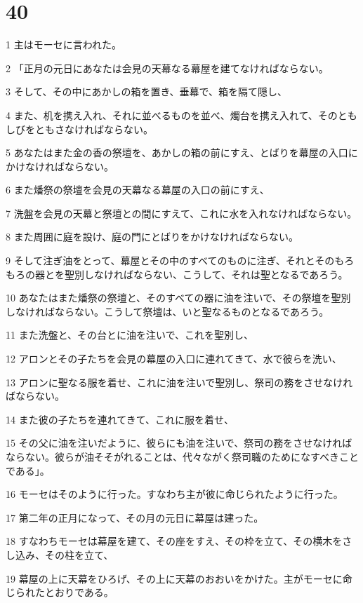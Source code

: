 \chapter{40}

\par 1 主はモーセに言われた。
\par 2 「正月の元日にあなたは会見の天幕なる幕屋を建てなければならない。
\par 3 そして、その中にあかしの箱を置き、垂幕で、箱を隔て隠し、
\par 4 また、机を携え入れ、それに並べるものを並べ、燭台を携え入れて、そのともしびをともさなければならない。
\par 5 あなたはまた金の香の祭壇を、あかしの箱の前にすえ、とばりを幕屋の入口にかけなければならない。
\par 6 また燔祭の祭壇を会見の天幕なる幕屋の入口の前にすえ、
\par 7 洗盤を会見の天幕と祭壇との間にすえて、これに水を入れなければならない。
\par 8 また周囲に庭を設け、庭の門にとばりをかけなければならない。
\par 9 そして注ぎ油をとって、幕屋とその中のすべてのものに注ぎ、それとそのもろもろの器とを聖別しなければならない、こうして、それは聖となるであろう。
\par 10 あなたはまた燔祭の祭壇と、そのすべての器に油を注いで、その祭壇を聖別しなければならない。こうして祭壇は、いと聖なるものとなるであろう。
\par 11 また洗盤と、その台とに油を注いで、これを聖別し、
\par 12 アロンとその子たちを会見の幕屋の入口に連れてきて、水で彼らを洗い、
\par 13 アロンに聖なる服を着せ、これに油を注いで聖別し、祭司の務をさせなければならない。
\par 14 また彼の子たちを連れてきて、これに服を着せ、
\par 15 その父に油を注いだように、彼らにも油を注いで、祭司の務をさせなければならない。彼らが油そそがれることは、代々ながく祭司職のためになすべきことである」。
\par 16 モーセはそのように行った。すなわち主が彼に命じられたように行った。
\par 17 第二年の正月になって、その月の元日に幕屋は建った。
\par 18 すなわちモーセは幕屋を建て、その座をすえ、その枠を立て、その横木をさし込み、その柱を立て、
\par 19 幕屋の上に天幕をひろげ、その上に天幕のおおいをかけた。主がモーセに命じられたとおりである。
